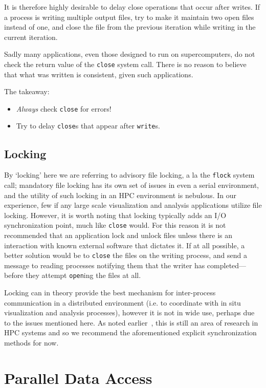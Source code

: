It is therefore highly desirable to delay close operations that occur
after writes.  If a process is writing multiple output files, try to
make it maintain two open files instead of one, and close the file from
the previous iteration while writing in the current iteration.

Sadly many applications, even those designed to run on supercomputers,
do not check the return value of the \verb!close! system call.  There
is no reason to believe that what was written is consistent, given
such applications.

The takeaway:

\begin{itemize}
  \item \emph{Always} check \verb!close! for errors!
  \item Try to delay \verb!close!s that appear after \verb!write!s.
\end{itemize}

\subsection{Locking}

By `locking' here we are referring to advisory file locking, a la
the \verb!flock! system call; mandatory file locking has its own
set of issues in even a serial environment, and the utility of such
locking in an HPC environment is nebulous.  In our experience, few
if any large scale visualization and analysis applications utilize
file locking.  However, it is worth noting that locking typically
adds an I/O synchronization point, much like \verb!close! would.  For
this reason it is not recommended that an application lock and unlock
files unless there is an interaction with known external software
that dictates it.  If at all possible, a better solution would be to
\verb!close! the files on the writing process, and send a message to
reading processes notifying them that the writer has completed---before
they attempt \verb!open!ing the files at all.

Locking can in theory provide the best mechanism for inter-process
communication in a distributed environment (i.e. to coordinate with in
situ visualization and analysis processes), however it is not in wide
use, perhaps due to the issues mentioned here.  As noted
earlier~\cite{Ching:2007:Locking}, this is still an area of research
in HPC systems and so we recommend the aforementioned explicit
synchronization methods for now.

\section{Parallel Data Access}\label{sec:access}

